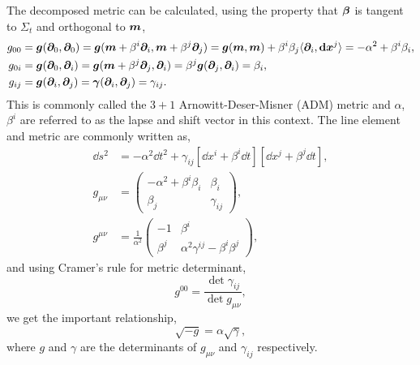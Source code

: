 The decomposed metric can be calculated, using the property that $\boldsymbol{\beta}$ is tangent to $\Sigma_t$ and orthogonal to $\boldsymbol{m}$,
\begin{align} 
g_{00} &= \boldsymbol{g}(\boldsymbol{\partial}_0,\boldsymbol{\partial}_0) = \boldsymbol{g}(\boldsymbol{m} + \beta^i \boldsymbol{\partial}_i,\boldsymbol{m} + \beta^j\boldsymbol{\partial}_j) = \boldsymbol{g}(\boldsymbol{m},\boldsymbol{m}) + \beta^i \beta_j \langle \boldsymbol{\partial}_i,{\boldsymbol{\mathrm{d}}} \boldsymbol{x}^j \rangle = -\alpha^2 + \beta^i \beta_i ,\\
 g_{0i} &= \boldsymbol{g} (\boldsymbol{\partial}_0,\boldsymbol{\partial}_i) =  \boldsymbol{g}(\boldsymbol{m} + \beta^j \boldsymbol{\partial}_j, \boldsymbol{\partial}_i) =   \beta^j\boldsymbol{g}( \boldsymbol{\partial}_j, \boldsymbol{\partial}_i) = \beta_i,\\
 g_{ij} &= \boldsymbol{g}(\boldsymbol{\partial}_i,\boldsymbol{\partial}_j) = \boldsymbol{\gamma}(\boldsymbol{\partial}_i,\boldsymbol{\partial}_j) = \gamma_{ij}.
 \end{align}
This is commonly called the $3+1$ Arnowitt-Deser-Misner (ADM) metric and $\alpha$, $\beta^i$ are referred to as the lapse and shift vector in this context. The line element and metric are commonly written as,
\begin{align}
\dd s^2 &= -\alpha^2 \dd t^2 + \gamma_{ij}\left[\dd x^i + \beta^i \dd t\right]\left[\dd x^j + \beta^j \dd t\right],\\
 g_{\mu\nu} &= \begin{pmatrix} -\alpha^2 + \beta^i \beta_i & \beta_i \\ \beta_j & \gamma_{ij} \end{pmatrix},\label{nr:eq:admmetric}\\
  g^{\mu\nu} &= \frac{1}{\alpha^2}\begin{pmatrix} -1  & \beta^i \\ \beta^j & \alpha^2\gamma^{ij} - \beta^i \beta^j \end{pmatrix},
 \end{align}
and using Cramer's rule for metric determinant,
\begin{equation} g^{00} = \frac{\det{\gamma_{ij}}}{\det{g_{\mu\nu}}},\end{equation}
we get the important relationship,
\begin{equation} \sqrt{-g} = \alpha \sqrt{\gamma} ,\label{nr:eq:gay}\end{equation}
where $g$ and $\gamma$ are the determinants of $g_{\mu\nu}$ and $\gamma_{ij}$ respectively.

